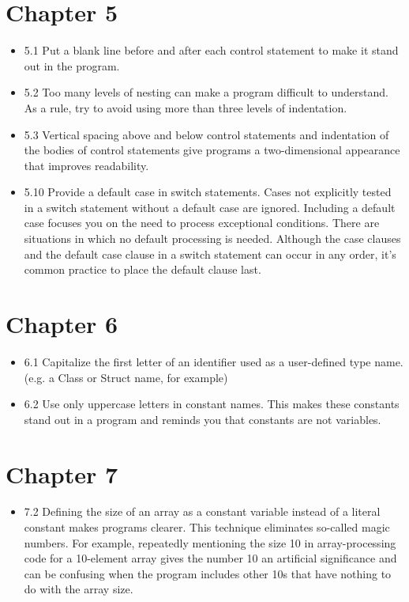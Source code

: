 \documentclass[11pt]{article}
\begin{document}
\section*{Chapter 5}
\label{sec-5}
\begin{itemize}
\item 5.1 Put a blank line before and after each control statement to make
it stand out in the program.
\item 5.2 Too many levels of nesting can make a program difficult to
understand. As a rule, try to avoid using more than three levels of
indentation.
\item 5.3 Vertical spacing above and below control statements and
indentation of the bodies of control statements give programs a
two-dimensional appearance that improves readability.
\item 5.10 Provide a default case in switch statements. Cases not
explicitly tested in a switch statement without a default case are
ignored. Including a default case focuses you on the need to process
exceptional conditions. There are situations in which no default
processing is needed. Although the case clauses and the default case
clause in a switch statement can occur in any order, it’s common
practice to place the default clause last.
\end{itemize}
\section*{Chapter 6}
\label{sec-6}
\begin{itemize}
\item 6.1 Capitalize the first letter of an identifier used as a
user-defined type name. (e.g. a Class or Struct name, for example)
\item 6.2 Use only uppercase letters in constant names. This makes these
constants stand out in a program and reminds you that constants are
not variables.
\end{itemize}
\section*{Chapter 7}
\label{sec-7}
\begin{itemize}
\item 7.2 Defining the size of an array as a constant variable instead of
a literal constant makes programs clearer. This technique eliminates
so-called magic numbers. For example, repeatedly mentioning the size
10 in array-processing code for a 10-element array gives the number
10 an artificial significance and can be confusing when the program
includes other 10s that have nothing to do with the array size.
\end{itemize}
\end{document}
